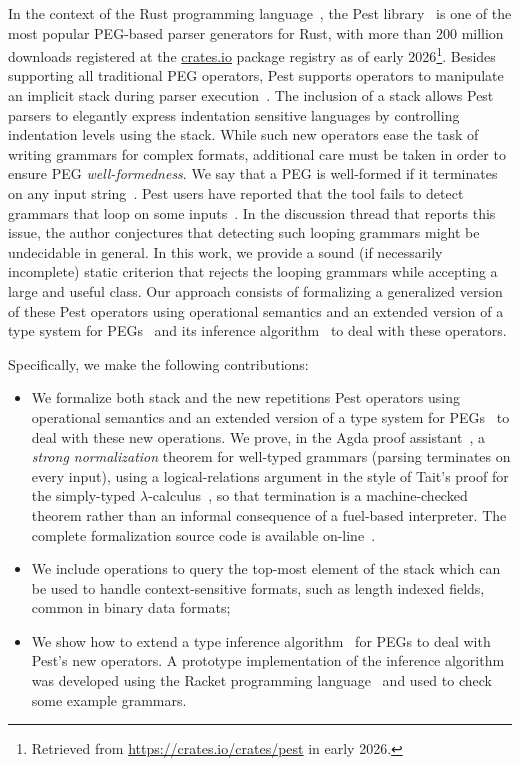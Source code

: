 \documentclass[preprint,12pt]{elsarticle}
\theoremstyle{definition}
\begin{document}
In the context of the Rust programming language~\cite{RustBook}, the
Pest library~\cite{PEST} is one of the most popular PEG-based parser
generators for Rust, with more than 200 million downloads registered at
the \href{http://crates.io}{crates.io} package registry as of early
2026\footnote{Retrieved from \url{https://crates.io/crates/pest} in early
2026.}. Besides supporting
all traditional PEG operators, Pest supports operators to manipulate an
implicit stack during parser execution~\cite{PESTSTACK}. The inclusion of a stack allows
Pest parsers to elegantly express indentation sensitive languages by
controlling indentation levels using the stack. While such new operators
ease the task of writing grammars for complex formats, additional care
must be taken in order to ensure PEG \emph{well-formedness}. We
say that a PEG is well-formed if it terminates on any input
string~\cite{Ford2004}. Pest users have reported that the tool
fails to detect grammars that loop on some inputs~\cite{PESTBUG}. In the
discussion thread that reports this issue, the author conjectures that detecting
such looping grammars might be undecidable in general.
In this work, we provide a sound (if necessarily incomplete)
static criterion that rejects the looping grammars while accepting a large and
useful class. Our approach consists of formalizing a generalized
version of these Pest operators using operational semantics and
an extended version of a type system for PEGs~\cite{Ribeiro19} and its
inference algorithm~\cite{Cardoso23} to deal with these operators.

Specifically, we make the following contributions:

\begin{itemize}
  \item We formalize both stack and the new repetitions Pest operators using
    operational semantics and an extended version of a type system for PEGs~\cite{Ribeiro19}
    to deal with these new operations. We prove, in the Agda proof
    assistant~\cite{agda}, a \emph{strong normalization} theorem for well-typed grammars (parsing terminates on every input), using a logical-relations argument in the style
    of Tait's proof for the simply-typed $\lambda$-calculus~\cite{plfa22.08}, so that
    termination is a machine-checked theorem rather than an informal consequence of a
    fuel-based interpreter. The complete formalization source code is available
    on-line~\cite{pegrepository}.
  \item We include operations to query the top-most element of the stack
    which can be used to handle context-sensitive formats, such as length
    indexed fields, common in binary data formats;
  \item We show how to extend a type inference algorithm~\cite{Cardoso23} for PEGs
    to deal with Pest's new operators. A prototype implementation of the inference
    algorithm was developed using the Racket programming language~\cite{Culpepper19}
    and used to check some example grammars.
\end{itemize}
\end{document}
